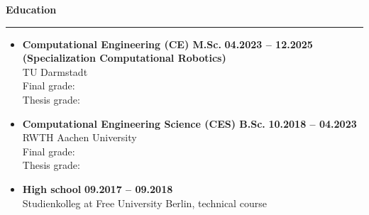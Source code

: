 \documentclass[12pt]{article} %
\newcommand{\HighlightedText}[1] {{\textbf{#1}}}
\newcommand{\PlaceAndTime}[2] {\HighlightedText{#1} \hfill \HighlightedText{#2}}
\newenvironment{ItemizeSection}[1]{
    \vspace{1mm}
    \HighlightedText{#1}
    \vspace{0.5mm}
    {\color{custom_blue} \hrule}
    \begin{itemize}[left=0.5em, topsep=0pt, itemsep=0pt, label={$\bullet$}]
}{
    \end{itemize}
}
\begin{document}
\begin{ItemizeSection}{Education}
    \item \PlaceAndTime{Computational Engineering (CE) M.Sc.}{04.2023 -- 12.2025} \\
    \textbf{(Specialization Computational Robotics)} \\
    TU Darmstadt \\
    Final grade:  \\
    Thesis grade: 

    \item \PlaceAndTime{Computational Engineering Science (CES) B.Sc.}{10.2018 -- 04.2023} \\
    RWTH Aachen University \\
    Final grade:  \\
    Thesis grade: 

    \item \PlaceAndTime{High school}{09.2017 -- 09.2018} \\
     Studienkolleg at Free University Berlin, technical course
\end{ItemizeSection}
\end{document}
